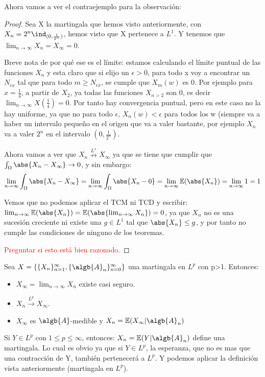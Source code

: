 \documentclass{apuntes}
\begin{document}
Ahora vamos a ver el contraejemplo para la observación:
\begin{proof}
Sea X la martingala que hemos visto anteriormente, con $X_n=  2^n \ind_{(0, \frac{1}{2^n})}$, hemos visto que X pertenece a $L^1$. Y tenemos que $\lim_{n \rightarrow \infty} X_n = X_{\infty} = 0$.

Breve nota de por qué ese es el límite: estamos calculando el límite puntual de las funciones $X_n$ y esta claro que si elijo un $\epsilon >0$, para todo x voy a encontrar un $N_{\epsilon x}$ tal que para todo $m \geq N_{\epsilon x}$, se cumple que $X_m(w)$ es 0. Por ejemplo para $x=\frac{1}{4}$, a partir de $X_2$, ya todas las funciones $X_{n>2}$ son 0, es decir $\lim_{n \rightarrow \infty} X(\frac{1}{4})=0$. Por tanto hay convergencia puntual, pero en este caso no la hay uniforme, ya que no para todo $\epsilon$, $X_n(w)<\epsilon$ para todos los w (siempre va a haber un intervalo pequeño en el origen que va a valer bastante, por ejemplo $X_n$ va a valer $2^n$ en el intervalo $(0, \frac{1}{2^n})$. 

Ahora vamos a ver que  $X_n \stackrel{L^1}{\nrightarrow} X_{\infty}$ ya que se tiene que cumplir que $\int_{\Omega} \abs{X_n - X_{\infty}} \rightarrow 0$, y sin embargo:
\[
\lim_{n \rightarrow \infty} \int_{\Omega} \abs{X_n - X_{\infty}} = \lim_{n \rightarrow \infty} \int_{\Omega} \abs{X_n - 0} = \lim_{n \rightarrow \infty} \mathbb{E}(\abs{X_n}) = \lim_{n \rightarrow \infty} 1 = 1
\]

Vemos que no podemos aplicar el TCM ni TCD y escribir: $\lim_{n \rightarrow \infty} \mathbb{E}(\abs{X_n}) =  \mathbb{E}(\abs{\lim_{n \rightarrow \infty} X_n}) = 0$, ya que $X_n$ no es una sucesión creciente ni existe una $g \in L^1$ tal que $\abs{X_n} \leq g$, y por tanto no cumple las condiciones de ninguno de los teoremas.

\textcolor{red}{Preguntar si esto está bien razonado.}
\end{proof}

\begin{theorem}

Sea $X=\{\{X_n\}_{n=1}^{\infty}, \{\algb{A}_n\}_{n=0}^{\infty}\}$ una martingala en $L^p$ con p>1. Entonces:
\begin{itemize}
\item $X_{\infty}=\lim_{n \rightarrow \infty} X_n$ existe casi seguro.
\item $X_n \stackrel{L^p}{\rightarrow} X_{\infty}$.

\item $X_{\infty}$ es $\algb{A}$-medible y $X_n=\mathbb{E}(X_{\infty}|\algb{A}_n)$ 
\end{itemize}
\obs Si $Y \in L^p$ con $1 \leq p \leq \infty$, entonces: $X_n= \mathbb{E}(Y|\algb{A}_n)$ define una martingala. Lo cual es obvio ya que si $Y \in L^p$, la esperanza, que no es mas que una contracción de Y, también pertenecerá a $L^p$. Y podemos aplicar la definición vista anteriormente (martingala en $L^p$).

\end{theorem}
\end{document}
